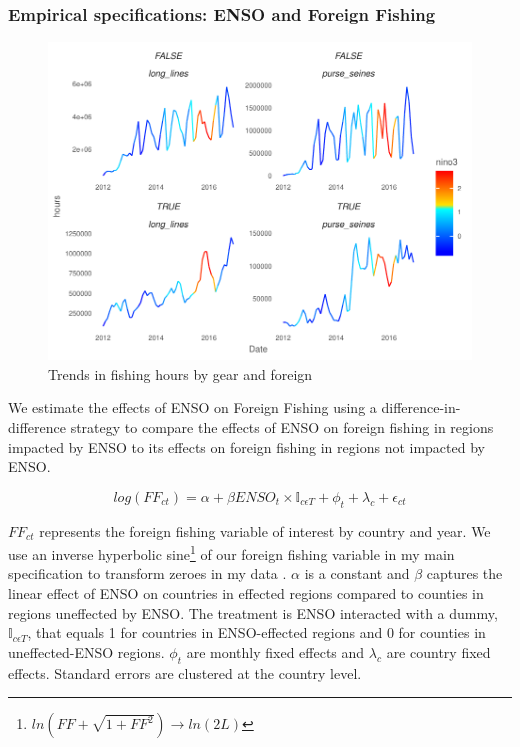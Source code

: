 \documentclass[11pt]{article}
\begin{document}
\subsubsection{Empirical specifications: ENSO and Foreign Fishing}
\label{ENSO_FF}

\begin{figure}
\centering
\includegraphics{../img/trends_by_gear.pdf}
\caption{Trends in fishing hours by gear and foreign}
\end{figure}

We estimate the effects of ENSO on Foreign Fishing using a difference-in-difference strategy to compare the effects of ENSO on foreign fishing in regions impacted by ENSO to its effects on foreign fishing in regions not impacted by ENSO. 

\begin{equation}
\label{eq_FF}
log(FF_{ct}) = \alpha + \beta ENSO_{t} \times \mathbb{I}_{c \epsilon T} + \phi_{t} + \lambda_{c} + \epsilon_{ct}
\end{equation}


\noindent $FF_{ct}$ represents the foreign fishing variable of interest by country and year. We use an inverse hyperbolic sine\footnote{$ln(FF+\sqrt{1+FF^2}) \xrightarrow{} ln(2L)$} of our foreign fishing variable in my main specification to transform zeroes in my data \cite{Burbidge:1988, Card:2017}. $\alpha$ is a constant and $\beta$ captures the linear effect of ENSO on countries in effected regions compared to counties in regions uneffected by ENSO. The treatment is ENSO interacted with a dummy, $\mathbb{I}_{c \epsilon T}$, that equals 1 for countries in ENSO-effected regions and 0 for counties in uneffected-ENSO regions. $\phi_{t}$ are monthly fixed effects and $\lambda_{c}$ are country fixed effects. Standard errors are clustered at the country level.
\end{document}
